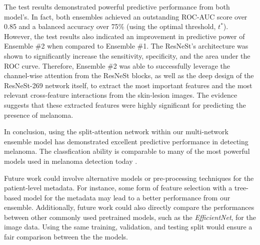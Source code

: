 \documentclass [MAS] {uclathes}
\begin{document}
The test results demonstrated powerful predictive performance from both model's. In fact, both ensembles achieved an outstanding ROC-AUC score over 0.85 and a balanced accuracy over 75\% (using the optimal threshold, $t^*$). However, the test results also indicated an improvement in predictive power of Ensemble \#2 when compared to Ensemble \#1. The ResNeSt's architecture was shown to significantly increase the sensitivity, specificity, and the area under the ROC curve. Therefore, Ensemble \#2 was able to successfully leverage the channel-wise attention from the ResNeSt blocks, as well as the deep design of the ResNeSt-269 network itself, to extract the most important features and the most relevant cross-feature interactions from the skin-lesion images. The evidence suggests that these extracted features were highly significant for predicting the presence of melanoma.

In conclusion, using the split-attention network within our multi-network ensemble model has demonstrated excellent predictive performance in detecting melanoma. The classfication ability is comparable to many of the most powerful models used in melanoma detection today \cite{EffNet_MelDet}. 

Future work could involve alternative models or pre-processing techniques for the patient-level metadata. For instance, some form of feature selection with a tree-based model for the metadata may lead to a better performance from our ensemble. Additionally, future work could also directly compare the performances between other commonly used pretrained models, such as the \textit{EfficientNet}, for the image data. Using the same training, validation, and testing split would ensure a fair comparison between the the models.


\end{document}
